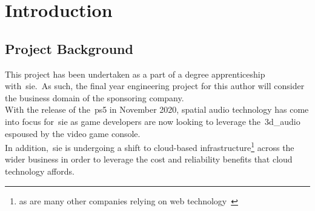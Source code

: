 \thispagestyle{plain}
\newpage
\section{Introduction}\label{sec:introduction}
\subsection{Project Background}\label{subsec:project-background}
\normalsize

This project has been undertaken as a part of a degree apprenticeship with~\gls{sie}.\
As such, the final year engineering project for this author will consider the business domain of the sponsoring company.\\

With the release of the~\gls{ps5} in November 2020, spatial audio technology has come into focus for~\gls{sie} as game developers are now looking to leverage the~\gls{3d_audio} espoused by the video game console.\\

In addition,~\gls{sie} is undergoing a shift to cloud-based infrastructure\footnote{as are many other companies relying on web technology~\citep{cc_overview}} across the wider business in order to leverage the cost and reliability benefits that cloud technology affords.\\

